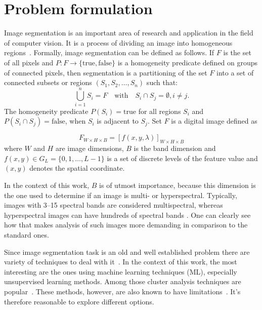\documentclass[runningheads]{llncs}
\begin{document}
\section{Problem formulation}
\label{sec:problem}

Image segmentation is an important area of research and application in the field
of computer vision. It is a process of dividing an image into homogeneous
regions~\cite{Pal1993}. 
Formally, image segmentation can be defined as follows. If $F$ is the set of all pixels and $P: F \to
\{\text{true},\text{false}\}$ is a homogeneity predicate defined on groups of connected pixels, then segmentation is a partitioning of the set $F$ into a set of connected subsets or regions $(S_{1},S_{2},\ldots,S_{n})$ such that:
\begin{equation}
	\label{segmentation_eq}
    \bigcup_{i=1}^{n} S_{i}=F \quad \text{with} \quad S_{i} \cap S_{j} =
    \emptyset, i \neq j.
\end{equation}
\noindent The homogeneity predicate $P(S_{i})=\text{true}$ for all regions
$S_{i}$ and $P(S_{i} \cap S_{j})=\text{false}$, when $S_{i}$ is adjacent to
$S_{j}$. Set $F$ is a digital image defined as 

\begin{equation}
	\label{eq:image}
	F_{W \times H \times B}=[f(x,y,\lambda)]_{W \times H \times B}
\end{equation}
\noindent where $W$ and $H$ are image dimensions, $B$ is the band dimension and
$f(x,y) \in G_{L}=\{0,1, \ldots, L-1\}$ is a set of discrete levels of the
feature value and $(x,y)$ denotes the spatial coordinate. 

In the context of this work, $B$ is of utmost importance, because this
dimension is the one used to determine if an image is multi- or hyperspectral.
Typically, images with 3--15 spectral bands are considered multispectral, 
whereas hyperspectral images can have hundreds of spectral bands
\cite{Hagen2013}. One can clearly see how that makes analysis of such images
more demanding in comparison to the standard ones.

Since image segmentation task is an old and well established problem there are
variety of techniques to deal with it~\cite{Pal1993}. In the context of this
work, the most interesting are the ones using machine learning techniques (ML),
especially unsupervised learning methods. Among those cluster analysis
techniques are popular~\cite{Bratchell1989}. These methods, however, are also
known to have limitations~\cite{GARCIADIAS2020227}. It's therefore reasonable to
explore different options.
\end{document}
